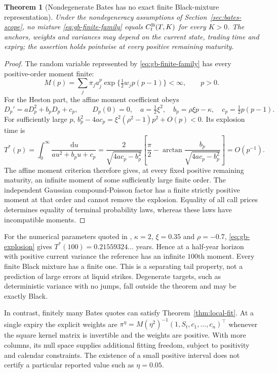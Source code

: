 \documentclass[11pt,a4paper]{article}
\numberwithin{equation}{section}
\newtheorem{theorem}{Theorem}[section]
\theoremstyle{definition}\newtheorem{definition}[theorem]{Definition}
\theoremstyle{remark}\newtheorem{remark}[theorem]{Remark}
\newcommand{\dd}{\,\mathrm d}\newcommand{\dt}{\,\mathrm dt}
\begin{document}
\begin{theorem}[Nondegenerate Bates has no exact finite Black-mixture representation]
\label{thm:gb-no-finite}
Under the nondegeneracy assumptions of Section~\ref{sec:bates-scope}, no mixture \eqref{eq:gb-finite-family} equals $C_t^{\rm B}(T,K)$ for every $K>0$. The anchors, weights and variances may depend on the current state, trading time and expiry; the assertion holds pointwise at every positive remaining maturity.
\end{theorem}
\begin{proof}
The random variable represented by \eqref{eq:gb-finite-family} has every positive-order moment finite:
\[
 M(p)=\sum_j\pi_j a_j^p\exp\{\tfrac12w_jp(p-1)\}<\infty,
 \qquad p>0.
\]
For the Heston part, the affine moment coefficient obeys
\begin{equation}
 D_p'=aD_p^2+b_pD_p+c_p,\qquad D_p(0)=0,
 \quad a=\tfrac12\xi^2,\quad b_p=\rho\xi p-\kappa,
 \quad c_p=\tfrac12p(p-1).
 \label{eq:gb-riccati}
\end{equation}
For sufficiently large $p$, $b_p^2-4ac_p=\xi^2(\rho^2-1)p^2+O(p)<0$. Its explosion time is
\begin{equation}
 T^*(p)=\int_0^\infty\frac{\dd u}{au^2+b_pu+c_p}
 =\frac{2}{\sqrt{4ac_p-b_p^2}}
   \left[\frac\pi2-\arctan\frac{b_p}{\sqrt{4ac_p-b_p^2}}\right]
 =O(p^{-1}).
 \label{eq:gb-explosion}
\end{equation}
The affine moment criterion \cite{MomentExplosion} therefore gives, at every fixed positive remaining maturity, an infinite moment of some sufficiently large finite order. The independent Gaussian compound-Poisson factor has a finite strictly positive moment at that order and cannot remove the explosion. Equality of all call prices determines equality of terminal probability laws, whereas these laws have incompatible moments.
\end{proof}

For the numerical parameters quoted in \cite{BatesCompatibility}, $\kappa=2$, $\xi=0.35$ and $\rho=-0.7$, \eqref{eq:gb-explosion} gives $T^*(100)=0.21559324\ldots$ years. Hence at a half-year horizon with positive current variance the reference has an infinite $100$th moment. Every finite Black mixture has a finite one. This is a separating tail property, not a prediction of large errors at liquid strikes. Degenerate targets, such as deterministic variance with no jumps, fall outside the theorem and may be exactly Black.

In contrast, finitely many Bates quotes can satisfy Theorem~\ref{thm:local-fit}. At a single expiry the explicit weights are $\pi^\eta=M(\eta^2)^{-1}(1,S_t,c_1,\ldots,c_n)^\top$ whenever the square kernel matrix is invertible and the weights are positive. With more columns, its null space supplies additional fitting freedom, subject to positivity and calendar constraints. The existence of a small positive interval does not certify a particular reported value such as $\eta=0.05$.
\end{document}
